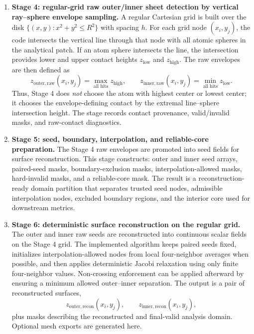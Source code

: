 \begin{enumerate}
  \item \textbf{Stage 4: regular-grid raw outer/inner sheet detection by vertical ray--sphere envelope sampling.}  
  A regular Cartesian grid is built over the disk \(\{(x,y): x^2+y^2 \le R^2\}\) with spacing \(h\). For each grid node \((x_i,y_j)\), the code intersects the vertical line through that node with all atomic spheres in the analytical patch. If an atom sphere intersects the line, the intersection provides lower and upper contact heights \(z_{\mathrm{low}}\) and \(z_{\mathrm{high}}\). The raw envelopes are then defined as
  \[
    z_{\mathrm{outer,raw}}(x_i,y_j) = \max_{\text{all hits}} z_{\mathrm{high}},
    \qquad
    z_{\mathrm{inner,raw}}(x_i,y_j) = \min_{\text{all hits}} z_{\mathrm{low}}.
  \]
  Thus, Stage 4 does \emph{not} choose the atom with highest center or lowest center; it chooses the envelope-defining contact by the extremal line--sphere intersection height. The stage records contact provenance, valid/invalid masks, and raw-contact diagnostics.

  \item \textbf{Stage 5: seed, boundary, interpolation, and reliable-core preparation.}  
  The Stage 4 raw envelopes are promoted into seed fields for surface reconstruction. This stage constructs: outer and inner seed arrays, paired-seed masks, boundary-exclusion masks, interpolation-allowed masks, hard-invalid masks, and a reliable-core mask. The result is a reconstruction-ready domain partition that separates trusted seed nodes, admissible interpolation nodes, excluded boundary regions, and the interior core used for downstream metrics.

  \item \textbf{Stage 6: deterministic surface reconstruction on the regular grid.}  
  The outer and inner raw seeds are reconstructed into continuous scalar fields on the Stage 4 grid. The implemented algorithm keeps paired seeds fixed, initializes interpolation-allowed nodes from local four-neighbor averages when possible, and then applies deterministic Jacobi relaxation using only finite four-neighbor values. Non-crossing enforcement can be applied afterward by ensuring a minimum allowed outer--inner separation. The output is a pair of reconstructed surfaces,
  \[
    z_{\mathrm{outer,recon}}(x_i,y_j), \qquad z_{\mathrm{inner,recon}}(x_i,y_j),
  \]
  plus masks describing the reconstructed and final-valid analysis domain. Optional mesh exports are generated here.


\end{enumerate}

